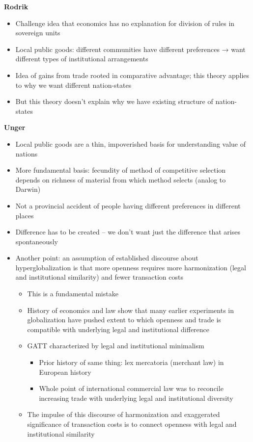 \textbf{Rodrik}

\begin{itemize}
\tightlist
\item
  Challenge idea that economics has no explanation for division of rules
  in sovereign units
\item
  Local public goods: different communities have different preferences →
  want different types of institutional arrangements
\item
  Idea of gains from trade rooted in comparative advantage; this theory
  applies to why we want different nation-states
\item
  But this theory doesn't explain why we have existing structure of
  nation-states
\end{itemize}

\textbf{Unger}

\begin{itemize}
\tightlist
\item
  Local public goods are a thin, impoverished basis for understanding
  value of nations
\item
  More fundamental basis: fecundity of method of competitive selection
  depends on richness of material from which method selects (analog to
  Darwin)
\item
  Not a provincial accident of people having different preferences in
  different places
\item
  Difference has to be created -- we don't want just the difference that
  arises spontaneously
\item
  Another point: an assumption of established discourse about
  hyperglobalization is that more openness requires more harmonization
  (legal and institutional similarity) and fewer transaction costs

  \begin{itemize}
  \tightlist
  \item
    This is a fundamental mistake
  \item
    History of economics and law show that many earlier experiments in
    globalization have pushed extent to which openness and trade is
    compatible with underlying legal and institutional difference
  \item
    GATT characterized by legal and institutional minimalism

    \begin{itemize}
    \tightlist
    \item
      Prior history of same thing: lex mercatoria (merchant law) in
      European history
    \item
      Whole point of international commercial law was to reconcile
      increasing trade with underlying legal and institutional diversity
    \end{itemize}
  \item
    The impulse of this discourse of harmonization and exaggerated
    significance of transaction costs is to connect openness with legal
    and institutional similarity
  \end{itemize}
\end{itemize}

